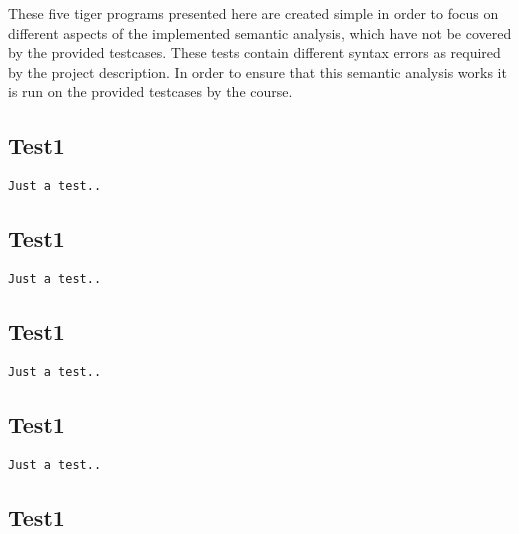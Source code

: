 \documentclass{article}
\begin{document}
These five tiger programs presented here are created simple in order to focus on different aspects of the implemented semantic analysis, which have not be covered by the provided testcases. These tests contain different syntax errors as required by the project description. In order to ensure that this semantic analysis works it is run on the provided testcases by the course. 



\subsection{Test1}

\begin{lstlisting}[frame=single]
Just a test..
\end{lstlisting}

\subsection{Test1}

\begin{lstlisting}[frame=single]
Just a test..
\end{lstlisting}

\subsection{Test1}

\begin{lstlisting}[frame=single]
Just a test..
\end{lstlisting}

\subsection{Test1}

\begin{lstlisting}[frame=single]
Just a test..
\end{lstlisting}

\subsection{Test1}
\end{document}
